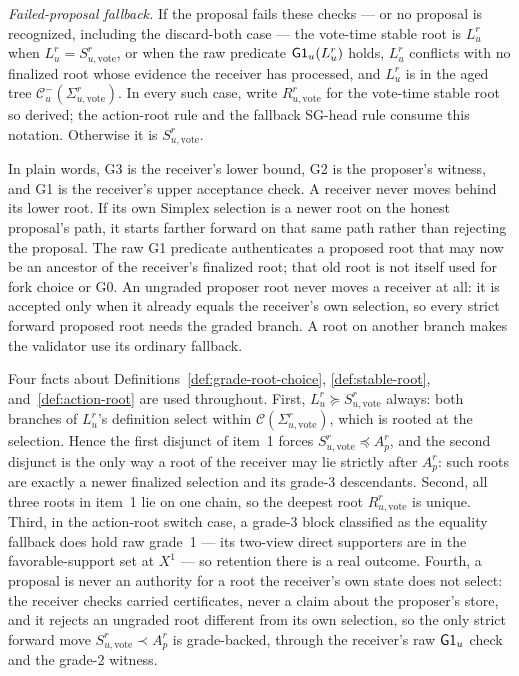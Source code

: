 \begin{definition}
\emph{Failed-proposal fallback.}
If the proposal fails these checks --- or no proposal is recognized,
including the discard-both case --- the vote-time stable root is \(L_u^r\)
when \(L_u^r=S_{u,\mathrm{vote}}^r\), or when the raw predicate
\(\mathsf{G1}_u(L_u^r)\) holds, \(L_u^r\) conflicts with no finalized root
whose evidence the receiver has processed, and \(L_u^r\) is in the aged
tree \(\mathcal C^{-}_u(\Sigma_{u,\mathrm{vote}}^r)\).  In every such case, write
\(R_{u,\mathrm{vote}}^r\) for the vote-time stable root so derived; the
action-root rule and the fallback SG-head rule consume this notation.  Otherwise it is
\(S_{u,\mathrm{vote}}^r\).

In plain words, G3 is the receiver's lower bound, G2 is the proposer's
witness, and G1 is the receiver's upper acceptance check.  A receiver never
moves behind its lower root.  If its own Simplex selection is a newer root on the
honest proposal's path, it starts farther forward on that same path rather
than rejecting the proposal.  The raw G1 predicate authenticates a proposed
root that may now be an ancestor of the receiver's finalized root; that old
root is not itself used for fork choice or G0.  An ungraded proposer root
never moves a receiver at all: it is accepted only when it already equals
the receiver's own selection, so every strict forward proposed root needs
the graded branch.  A root on
another branch makes the validator use its ordinary fallback.
\end{definition}

\begin{remark}
\label{rem:stable-root-coherence}
Four facts about
Definitions~\ref{def:grade-root-choice}, \ref{def:stable-root},
and~\ref{def:action-root} are used throughout.
First, \(L_u^r\succeq S_{u,\mathrm{vote}}^r\) always: both branches
of \(L_u^r\)'s definition select within
\(\mathcal C(\Sigma_{u,\mathrm{vote}}^r)\), which is rooted at the
selection.  Hence the first disjunct of item~1 forces
\(S_{u,\mathrm{vote}}^r\preceq A_p^r\), and the second disjunct is
the only way a root of the receiver may lie strictly after \(A_p^r\):
such roots are exactly a newer finalized selection and its grade-3
descendants.  Second, all three roots in item~1 lie on one chain, so the
deepest root \(R_{u,\mathrm{vote}}^r\) is unique.  Third, in the
action-root switch case, a grade-3 block classified as the equality
fallback does hold raw grade~1 --- its two-view direct supporters are in
the favorable-support set at \(X^1\) --- so retention there is a
real outcome.  Fourth, a proposal is never an authority for a root the
receiver's own state does not select: the receiver checks carried
certificates, never a claim about the proposer's store, and it rejects
an ungraded root different from its own selection, so the only strict
forward move \(S_{u,\mathrm{vote}}^r\prec A_p^r\) is grade-backed,
through the receiver's raw \(\mathsf{G1}_u\) check and the grade-2
witness.
\end{remark}

